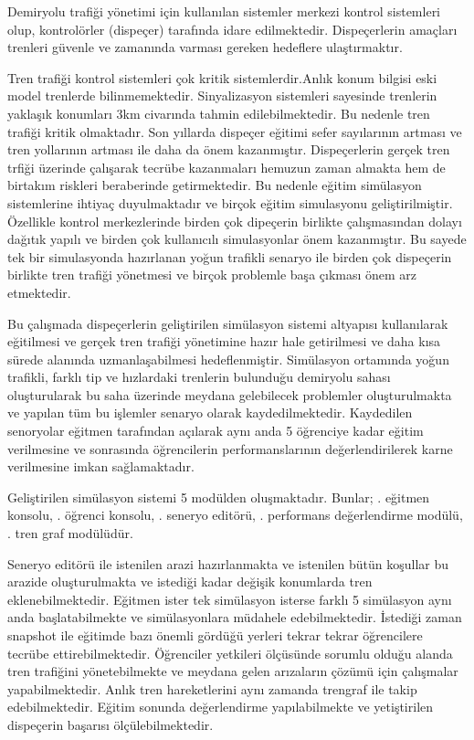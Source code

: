 \documentclass[conference]{IEEEtran}
\begin{document}
Demiryolu trafiği yönetimi için kullanılan sistemler merkezi kontrol sistemleri olup, kontrolörler (dispeçer) tarafında idare edilmektedir.  Dispeçerlerin amaçları trenleri güvenle ve zamanında varması gereken hedeflere ulaştırmaktır.

Tren trafiği kontrol sistemleri çok kritik sistemlerdir.Anlık konum bilgisi eski model trenlerde bilinmemektedir. Sinyalizasyon sistemleri sayesinde trenlerin yaklaşık konumları 3km civarında tahmin edilebilmektedir. Bu nedenle tren trafiği kritik olmaktadır. Son yıllarda dispeçer eğitimi sefer sayılarının artması ve tren yollarının artması ile daha da önem kazanmıştır. Dispeçerlerin gerçek tren trfiği üzerinde çalışarak tecrübe kazanmaları hemuzun zaman almakta hem de birtakım riskleri beraberinde getirmektedir. Bu nedenle eğitim simülasyon sistemlerine ihtiyaç duyulmaktadır ve birçok eğitim simulasyonu geliştirilmiştir. Özellikle kontrol merkezlerinde birden çok dipeçerin birlikte çalışmasından dolayı dağıtık yapılı ve birden çok kullanıcılı simulasyonlar önem kazanmıştır. Bu sayede tek bir simulasyonda hazırlanan yoğun trafikli senaryo ile birden çok dispeçerin birlikte tren trafiği yönetmesi ve birçok problemle başa çıkması önem arz etmektedir. 

Bu çalışmada dispeçerlerin geliştirilen simülasyon sistemi altyapısı kullanılarak eğitilmesi ve gerçek tren trafiği yönetimine hazır hale getirilmesi ve daha kısa sürede alanında uzmanlaşabilmesi hedeflenmiştir. Simülasyon ortamında yoğun trafikli, farklı tip ve hızlardaki trenlerin bulunduğu demiryolu sahası oluşturularak bu saha üzerinde meydana gelebilecek problemler oluşturulmakta ve yapılan tüm bu işlemler senaryo olarak kaydedilmektedir. Kaydedilen senoryolar eğitmen tarafından açılarak aynı anda 5 öğrenciye kadar eğitim verilmesine ve sonrasında öğrencilerin performanslarının  değerlendirilerek karne verilmesine imkan sağlamaktadır.

Geliştirilen simülasyon sistemi 5 modülden oluşmaktadır. 
Bunlar; 
. eğitmen konsolu, 
. öğrenci konsolu, 
. seneryo editörü, 
. performans değerlendirme modülü,
. tren graf modülüdür. 

Seneryo editörü ile istenilen arazi hazırlanmakta ve istenilen bütün koşullar bu arazide oluşturulmakta ve istediği kadar değişik konumlarda tren eklenebilmektedir. Eğitmen ister tek simülasyon isterse farklı 5 simülasyon aynı anda başlatabilmekte ve simülasyonlara müdahele edebilmektedir. İstediği zaman snapshot ile eğitimde bazı önemli gördüğü yerleri tekrar tekrar öğrencilere tecrübe ettirebilmektedir. Öğrenciler yetkileri ölçüsünde sorumlu olduğu alanda tren trafiğini yönetebilmekte ve meydana gelen arızaların çözümü için çalışmalar yapabilmektedir. Anlık tren hareketlerini aynı zamanda trengraf ile takip edebilmektedir. Eğitim sonunda değerlendirme yapılabilmekte ve yetiştirilen dispeçerin başarısı ölçülebilmektedir.
\end{document}
